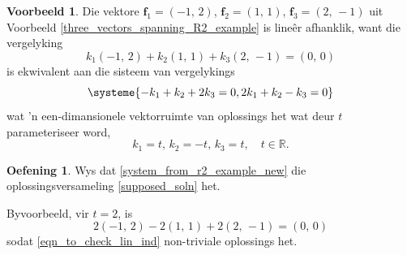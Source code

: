 \documentclass[a4paper,11pt]{book}
\theoremstyle{definition}
\newtheorem{exercise}{Oefening}
\newtheorem{example_environment}{Voorbeeld}[chapter]
\newcommand{\be}{\begin{equation}}
\newcommand{\ee}{\end{equation}}
\newcommand{\ve}[1]{\mathbf{#1}}
\newenvironment{example}
	{
		\begin{oframed}
		\begin{example_environment}
	}
	{
		\end{example_environment}
		\end{oframed}
	}
\begin{document}
\begin{example} \label{example_about_lin_dep_1} Die vektore $\ve{f}_1 =
	(-1, \, 2)$, $\ve{f}_2 = (1, \,1)$, $\ve{f}_3 = (2, \, -1)$ uit
	Voorbeeld  \ref{three_vectors_spanning_R2_example} is line{\^e}r
	afhanklik, want die vergelyking
	\be \label{eqn_to_check_lin_ind}
	k_1 (-1, \, 2) + k_2 (1, \, 1) + k_3 (2, \, -1) = (0, \, 0)
	\ee
	is ekwivalent aan die sisteem van vergelykings
	\be \label{system_from_r2_example_new}
	\systeme{-k_1 + k_2 + 2k_3 = 0, 2k_1 + k_2 - k_3 = 0}
	\ee
	wat 'n een-dimansionele vektorruimte van oplossings het wat deur $t$
	parameteriseer word,
	\be \label{supposed_soln}
	k_1 = t, \, k_2 = -t, \, k_3 = t, \quad t \in \mathbb{R}.
	\ee
	\begin{exercise}
		Wys dat \eqref{system_from_r2_example_new} die
		oplossingsversameling \eqref{supposed_soln} het.
	\end{exercise}
	Byvoorbeeld, vir $t=2$, is
	\[
		2 (-1, \, 2) - 2 (1, \, 1) + 2 (2, \, -1) = (0, \, 0)
	\]
	sodat \eqref{eqn_to_check_lin_ind} non-triviale oplossings het.
\end{example}
\end{document}
